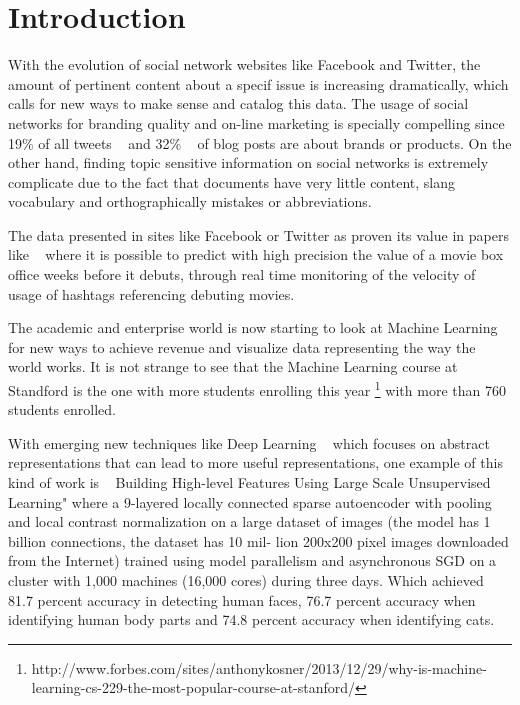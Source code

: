 
\section{Introduction}
\label{sub:introduction}

With the evolution of social network websites like Facebook and Twitter, the amount of pertinent content about a specif issue is increasing dramatically, which calls for new ways to make sense and catalog this data.
The usage of social networks for branding quality and on-line marketing is specially compelling since 19\% of all tweets ~\cite{Jansen2009} and 32\% ~\cite{Melville2009} of blog posts are about brands or products.
On the other hand, finding topic sensitive information on social networks is extremely complicate due to the fact that documents have very little content, slang vocabulary and orthographically mistakes or abbreviations.

The data presented in sites like Facebook or Twitter as proven its value in papers like ~\citet{Asur2010} where it is possible to predict with high precision the value of a movie box office weeks before it debuts, through real time monitoring of the velocity of usage of hashtags referencing debuting movies.

The academic and enterprise world is now starting to look at Machine Learning for new ways to achieve revenue and visualize data representing the way the world works. It is not strange to see that the Machine Learning course at Standford is the one with more students enrolling this year \footnote{http://www.forbes.com/sites/anthonykosner/2013/12/29/why-is-machine-learning-cs-229-the-most-popular-course-at-stanford/} with more than 760 students enrolled.

With emerging new techniques like Deep Learning ~\cite{Bengio2013} which focuses on abstract representations that can lead to more useful representations, one example of this kind of work is ~\cite{Le2011} Building High-level Features Using Large Scale Unsupervised Learning" where a 9-layered locally connected sparse autoencoder with pooling and local contrast normalization on a large dataset of images (the model has 1 billion connections, the dataset has 10 mil- lion 200x200 pixel images downloaded from the Internet) trained using model parallelism and asynchronous SGD on a cluster with 1,000 machines (16,000 cores) during three days. Which achieved 81.7 percent accuracy in detecting human faces, 76.7 percent accuracy when identifying human body parts and 74.8 percent accuracy when identifying cats.

